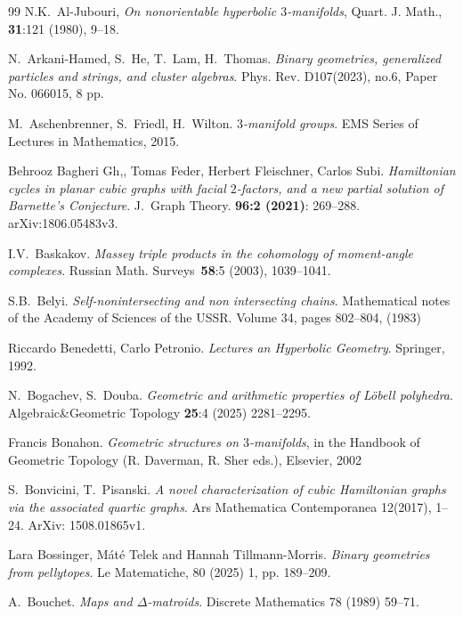\documentclass[12pt]{amsart}
\theoremstyle{definition}
\theoremstyle{remark}
\begin{document}
\begin{thebibliography}{99}
N.K.~Al-Jubouri, 
\emph{On nonorientable hyperbolic $3$-manifolds}, 
Quart. J. Math., {\bf 31}:121 (1980), 9--18.

N.~Arkani-Hamed, S.~He, T.~Lam, H.~Thomas. 
\emph{Binary geometries,
generalized particles and strings, and cluster algebras}.
Phys. Rev. D107(2023), no.6, Paper No. 066015, 8 pp.

M.~Aschenbrenner, S.~Friedl, H.~Wilton.
\emph{$3$-manifold groups}. 
EMS Series of Lectures in Mathematics, 2015.

Behrooz Bagheri Gh,, Tomas Feder, Herbert Fleischner, Carlos Subi.
\emph{Hamiltonian cycles in planar cubic graphs with facial $2$-factors, and a new partial solution of Barnette's Conjecture}.
J.~Graph Theory. {\bf 96:2 (2021)}: 269--288. arXiv:1806.05483v3.

I.V.~Baskakov. 
\emph{Massey triple products in the cohomology of moment-angle complexes}. 
Russian Math. Surveys~{\bf 58}:5 (2003), 1039--1041.

S.B.~Belyi.
\emph{Self-nonintersecting and non intersecting chains}.
Mathematical notes of the Academy of Sciences of the USSR.
Volume 34, pages 802--804, (1983)
  
Riccardo Benedetti, Carlo Petronio.
\emph{Lectures an Hyperbolic Geometry}.
Springer, 1992.

N.~Bogachev, S.~Douba.
\emph{Geometric and arithmetic properties of L\"obell polyhedra}.
Algebraic\&Geometric Topology {\bf 25}:4 (2025) 2281--2295.

Francis Bonahon. 
\emph{Geometric structures on $3$-manifolds}, 
in the Handbook of Geometric Topology
(R. Daverman, R. Sher eds.), Elsevier, 2002

S.~Bonvicini, T.~Pisanski.
\emph{A novel characterization of cubic Hamiltonian graphs via the associated quartic graphs}.
Ars Mathematica Contemporanea 12(2017), 1-- 24. ArXiv: 1508.01865v1.

Lara Bossinger, M\'{a}t\'{e} Telek and Hannah Tillmann-Morris.
\emph{Binary geometries from pellytopes}.
Le Matematiche, 80 (2025) 1, pp. 189--209.

A.~Bouchet.
\emph{Maps and $\Delta$-matroids}.
Discrete Mathematics 78 (1989) 59--71.


\end{thebibliography}
\end{document}
